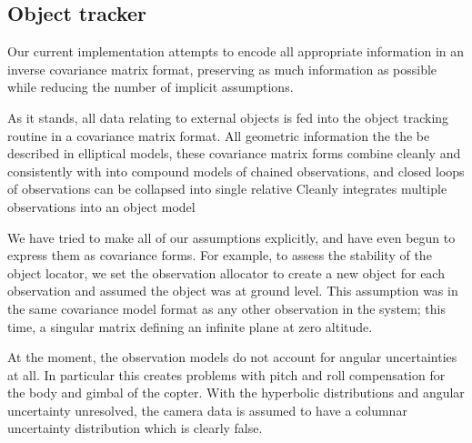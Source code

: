 \documentclass{article}
\begin{document}
  \subsection{Object tracker}
    Our current implementation attempts to encode all appropriate information in an inverse covariance matrix format, preserving as much information as possible while reducing the number of implicit assumptions.

      As it stands, all data relating to external objects is fed into the object tracking routine in a covariance matrix format.  
    All geometric information the the be described in elliptical models, these covariance matrix forms combine cleanly and consistently with 
     into compound models of chained observations, and closed loops of observations can be collapsed into single relative 
    Cleanly integrates multiple observations into an object model

    We have tried to make all of our assumptions explicitly, and have even begun to express them as covariance forms.
    For example, to assess the stability of the object locator, we set the observation allocator to create a new object for each observation and assumed the object was at ground level.  This assumption was in the same covariance model format as any other observation in the system; this time, a singular matrix defining an infinite plane at zero altitude.

    At the moment, the observation models do not account for angular uncertainties at all.  In particular this creates problems with pitch and roll compensation for the body and gimbal of the copter.
    With the hyperbolic distributions and angular uncertainty unresolved, the camera data is assumed to have a columnar uncertainty distribution which is clearly false. 

\end{document}
